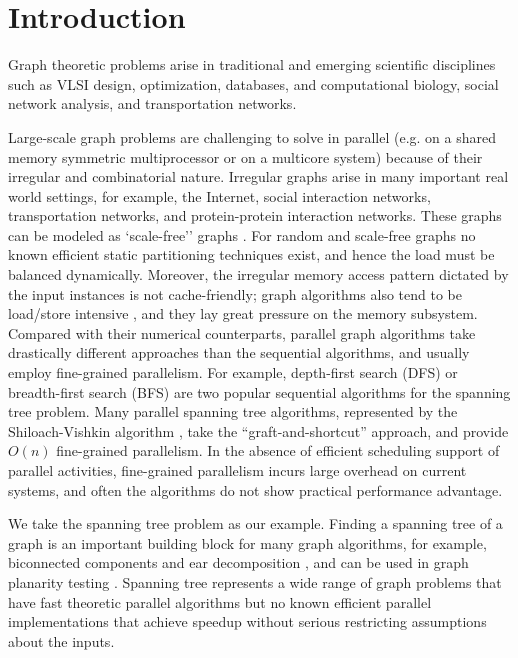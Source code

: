 \documentclass[10pt]{article}
\numberwithin{equation}{section}
\begin{document}
\section{Introduction}
\label{s:intr}


Graph theoretic problems arise in traditional and emerging scientific
disciplines such as VLSI design, optimization, databases, and
computational biology, social network analysis, and transportation
networks.

Large-scale graph problems are challenging to solve in parallel
(e.g.{} on a shared memory symmetric multiprocessor or on a multicore
system) because of their irregular and combinatorial nature.
Irregular graphs arise in many important real world settings, for
example, the Internet, social interaction networks, transportation
networks, and protein-protein interaction networks.  These graphs can
be modeled as `scale-free'' graphs \cite{CZF04}. For random and
scale-free graphs no known efficient static partitioning techniques exist,
and hence the load must be balanced dynamically. 
Moreover, the irregular memory access pattern dictated by the input
instances is not cache-friendly; graph algorithms also tend to be
load/store intensive \cite{G06}, and they lay great pressure on the
memory subsystem.  
Compared with their numerical counterparts, parallel
graph algorithms take drastically different approaches than the
sequential algorithms, and usually employ fine-grained
parallelism. For example, depth-first search (DFS) or breadth-first
search (BFS) are two popular sequential algorithms for the spanning
tree problem. Many parallel spanning tree algorithms, represented by
the Shiloach-Vishkin algorithm \cite{SV82}, take the
``graft-and-shortcut'' approach, and provide $O(n)$ fine-grained
parallelism. In the absence of efficient scheduling support of
parallel activities, fine-grained parallelism incurs large overhead on
current systems, and often the algorithms do not show practical
performance advantage.

We take the spanning tree problem as our example. Finding a spanning
tree of a graph is an important building block for many graph
algorithms, for example, biconnected components and ear decomposition
\cite{MR86}, and can be used in graph planarity testing \cite{KR88}.
Spanning tree represents a wide range of graph problems that have fast
theoretic parallel algorithms but no known efficient parallel
implementations that achieve speedup without serious restricting
assumptions about the inputs.
\end{document}
